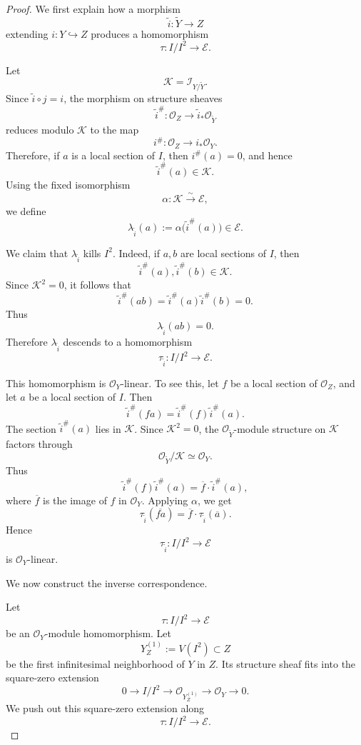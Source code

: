 \documentclass[11pt,twoside]{amsart}
\theoremstyle{plain}
\numberwithin{equation}{section}
\theoremstyle{definition}
\begin{document}
\begin{proof}
We first explain how a morphism
\[
    \widetilde i:\widetilde Y\to Z
\]
extending \(i:Y\hookrightarrow Z\) produces a homomorphism
\[
    \tau:I/I^2\to \mathcal E.
\]

Let
\[
    \mathcal K=\mathcal I_{Y/\widetilde Y}.
\]
Since \(\widetilde i\circ j=i\), the morphism on structure sheaves
\[
    \widetilde i^\#:\mathcal O_Z\longrightarrow \widetilde i_*\mathcal O_{\widetilde Y}
\]
reduces modulo \(\mathcal K\) to the map
\[
    i^\#:\mathcal O_Z\longrightarrow i_*\mathcal O_Y.
\]
Therefore, if \(a\) is a local section of \(I\), then \(i^\#(a)=0\), and hence
\[
    \widetilde i^\#(a)\in \mathcal K.
\]
Using the fixed isomorphism
\[
    \alpha:\mathcal K\xrightarrow{\sim}\mathcal E,
\]
we define
\[
    \lambda_{\widetilde i}(a)
    :=
    \alpha\bigl(\widetilde i^\#(a)\bigr)
    \in \mathcal E.
\]

We claim that \(\lambda_{\widetilde i}\) kills \(I^2\). Indeed, if \(a,b\) are local
sections of \(I\), then
\[
    \widetilde i^\#(a),\widetilde i^\#(b)\in \mathcal K.
\]
Since \(\mathcal K^2=0\), it follows that
\[
    \widetilde i^\#(ab)
    =
    \widetilde i^\#(a)\widetilde i^\#(b)
    =
    0.
\]
Thus
\[
    \lambda_{\widetilde i}(ab)=0.
\]
Therefore \(\lambda_{\widetilde i}\) descends to a homomorphism
\[
    \tau_{\widetilde i}:I/I^2\longrightarrow \mathcal E.
\]

This homomorphism is \(\mathcal O_Y\)-linear. To see this, let \(f\) be a local section
of \(\mathcal O_Z\), and let \(a\) be a local section of \(I\). Then
\[
    \widetilde i^\#(fa)
    =
    \widetilde i^\#(f)\widetilde i^\#(a).
\]
The section \(\widetilde i^\#(a)\) lies in \(\mathcal K\). Since \(\mathcal K^2=0\), the
\(\mathcal O_{\widetilde Y}\)-module structure on \(\mathcal K\) factors through
\[
    \mathcal O_{\widetilde Y}/\mathcal K\simeq\mathcal O_Y.
\]
Thus
\[
    \widetilde i^\#(f)\widetilde i^\#(a)
    =
    \overline f\cdot \widetilde i^\#(a),
\]
where \(\overline f\) is the image of \(f\) in \(\mathcal O_Y\). Applying \(\alpha\), we get
\[
    \tau_{\widetilde i}(\overline{fa})
    =
    \overline f\cdot \tau_{\widetilde i}(\overline a).
\]
Hence
\[
    \tau_{\widetilde i}:I/I^2\to\mathcal E
\]
is \(\mathcal O_Y\)-linear.

We now construct the inverse correspondence.

Let
\[
    \tau:I/I^2\to\mathcal E
\]
be an \(\mathcal O_Y\)-module homomorphism. Let
\[
    Y^{(1)}_Z:=V(I^2)\subset Z
\]
be the first infinitesimal neighborhood of \(Y\) in \(Z\). Its structure sheaf fits into
the square-zero extension
\[
    0\longrightarrow I/I^2
    \longrightarrow \mathcal O_{Y^{(1)}_Z}
    \longrightarrow \mathcal O_Y
    \longrightarrow 0.
\]
We push out this square-zero extension along
\[
    \tau:I/I^2\to\mathcal E.
\]


\end{proof}
\end{document}
